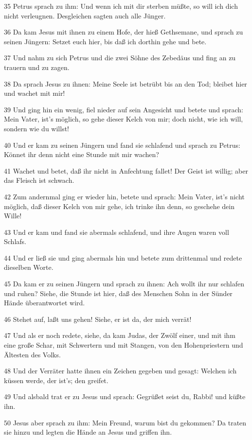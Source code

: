 \par 35 Petrus sprach zu ihm: Und wenn ich mit dir sterben müßte, so will ich dich nicht verleugnen. Desgleichen sagten auch alle Jünger.
\par 36 Da kam Jesus mit ihnen zu einem Hofe, der hieß Gethsemane, und sprach zu seinen Jüngern: Setzet euch hier, bis daß ich dorthin gehe und bete.
\par 37 Und nahm zu sich Petrus und die zwei Söhne des Zebedäus und fing an zu trauern und zu zagen.
\par 38 Da sprach Jesus zu ihnen: Meine Seele ist betrübt bis an den Tod; bleibet hier und wachet mit mir!
\par 39 Und ging hin ein wenig, fiel nieder auf sein Angesicht und betete und sprach: Mein Vater, ist's möglich, so gehe dieser Kelch von mir; doch nicht, wie ich will, sondern wie du willst!
\par 40 Und er kam zu seinen Jüngern und fand sie schlafend und sprach zu Petrus: Könnet ihr denn nicht eine Stunde mit mir wachen?
\par 41 Wachet und betet, daß ihr nicht in Anfechtung fallet! Der Geist ist willig; aber das Fleisch ist schwach.
\par 42 Zum andernmal ging er wieder hin, betete und sprach: Mein Vater, ist's nicht möglich, daß dieser Kelch von mir gehe, ich trinke ihn denn, so geschehe dein Wille!
\par 43 Und er kam und fand sie abermals schlafend, und ihre Augen waren voll Schlafs.
\par 44 Und er ließ sie und ging abermals hin und betete zum drittenmal und redete dieselben Worte.
\par 45 Da kam er zu seinen Jüngern und sprach zu ihnen: Ach wollt ihr nur schlafen und ruhen? Siehe, die Stunde ist hier, daß des Menschen Sohn in der Sünder Hände überantwortet wird.
\par 46 Stehet auf, laßt uns gehen! Siehe, er ist da, der mich verrät!
\par 47 Und als er noch redete, siehe, da kam Judas, der Zwölf einer, und mit ihm eine große Schar, mit Schwertern und mit Stangen, von den Hohenpriestern und Ältesten des Volks.
\par 48 Und der Verräter hatte ihnen ein Zeichen gegeben und gesagt: Welchen ich küssen werde, der ist's; den greifet.
\par 49 Und alsbald trat er zu Jesus und sprach: Gegrüßet seist du, Rabbi! und küßte ihn.
\par 50 Jesus aber sprach zu ihm: Mein Freund, warum bist du gekommen? Da traten sie hinzu und legten die Hände an Jesus und griffen ihn.
